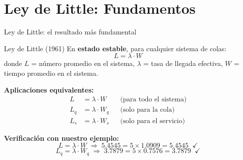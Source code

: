 \documentclass[aspectratio=1610, 9pt]{beamer}
\begin{document}
\section{Ley de Little: Fundamentos}

\begin{frame}{Ley de Little: el resultado más fundamental}

\begin{block}{Ley de Little (1961)}
En \textbf{estado estable}, para cualquier sistema de colas:
\[
\boxed{L = \lambda \cdot W}
\]
donde $L$ = número promedio en el sistema, $\lambda$ = tasa de llegada efectiva, $W$ = tiempo promedio en el sistema.
\end{block}

\vspace{0.3cm}
\textbf{Aplicaciones equivalentes:}
\begin{align}
L &= \lambda \cdot W && \text{(para todo el sistema)} \\
L_q &= \lambda \cdot W_q && \text{(solo para la cola)} \\
L_s &= \lambda \cdot W_s && \text{(solo para el servicio)}
\end{align}

\vspace{0.3cm}
\textbf{Verificación con nuestro ejemplo:}
\[
L = \lambda \cdot W \;\Rightarrow\; 5.4545 = 5 \times 1.0909 = 5.4545 \;\; \checkmark
\]
\[
L_q = \lambda \cdot W_q \;\Rightarrow\; 3.7879 = 5 \times 0.7576 = 3.7879 \;\; \checkmark
\]
\end{frame}
\end{document}
